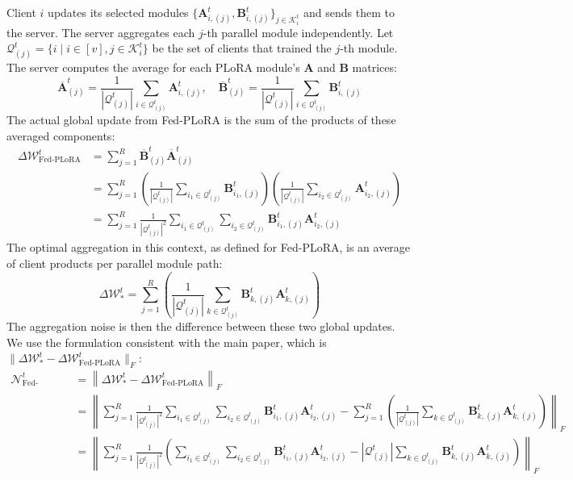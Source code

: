 \documentclass{article} %
\newcommand{\mat}[1]{\mathbf{#1}}
\begin{document}
Client $i$ updates its selected modules $\{\mat{A}_{i,(j)}^t, \mat{B}_{i,(j)}^t\}_{j \in \mathcal{K}_i^t}$ and sends them to the server.
The server aggregates each $j$-th parallel module independently. Let $\mathcal{Q}_{(j)}^t = \{i \mid i \in [v], j \in \mathcal{K}_i^t\}$ be the set of clients that trained the $j$-th module. The server computes the average for each PLoRA module's $\mat{A}$ and $\mat{B}$ matrices:
$$\overline{\mat{A}}_{(j)}^t = \frac{1}{|\mathcal{Q}_{(j)}^t|} \sum_{i \in \mathcal{Q}_{(j)}^t} \mat{A}_{i,(j)}^t, \quad \overline{\mat{B}}_{(j)}^t = \frac{1}{|\mathcal{Q}_{(j)}^t|} \sum_{i \in \mathcal{Q}_{(j)}^t} \mat{B}_{i,(j)}^t$$
The actual global update from Fed-PLoRA is the sum of the products of these averaged components:
\begin{align*}
\Delta\boldsymbol{\mathcal{W}}_{\text{Fed-PLoRA}}^t &= \sum_{j=1}^R \overline{\mat{B}}_{(j)}^t \overline{\mat{A}}_{(j)}^t \\
&= \sum_{j=1}^R \left( \frac{1}{|\mathcal{Q}_{(j)}^t|} \sum_{i_1 \in \mathcal{Q}_{(j)}^t} \mat{B}_{i_1,(j)}^t \right) \left( \frac{1}{|\mathcal{Q}_{(j)}^t|} \sum_{i_2 \in \mathcal{Q}_{(j)}^t} \mat{A}_{i_2,(j)}^t \right) \\
&= \sum_{j=1}^R \frac{1}{|\mathcal{Q}_{(j)}^t|^2} \sum_{i_1 \in \mathcal{Q}_{(j)}^t} \sum_{i_2 \in \mathcal{Q}_{(j)}^t} \mat{B}_{i_1,(j)}^t \mat{A}_{i_2,(j)}^t
\end{align*}
The optimal aggregation in this context, as defined for Fed-PLoRA, is an average of client products per parallel module path:
$$\Delta\boldsymbol{\mathcal{W}}_{*}^t = \sum_{j=1}^R \left( \frac{1}{|\mathcal{Q}_{(j)}^t|} \sum_{k \in \mathcal{Q}_{(j)}^t} \mat{B}_{k,(j)}^t \mat{A}_{k,(j)}^t \right)$$
The aggregation noise is then the difference between these two global updates. We use the formulation consistent with the main paper, which is $\|\Delta\boldsymbol{\mathcal{W}}_{*}^t-\Delta\boldsymbol{\mathcal{W}}_{\text{Fed-PLoRA}}^t \|_F$:
\begin{align*}
\mathcal{N}_{\text{Fed-PLoRA\_Agg}}^{t} &= \left\| \Delta\boldsymbol{\mathcal{W}}_{*}^t - \Delta\boldsymbol{\mathcal{W}}_{\text{Fed-PLoRA}}^t\right\|_F \\
&= \left\| \sum_{j=1}^R \frac{1}{|\mathcal{Q}_{(j)}^t|^2} \sum_{i_1 \in \mathcal{Q}_{(j)}^t} \sum_{i_2 \in \mathcal{Q}_{(j)}^t} \mat{B}_{i_1,(j)}^t \mat{A}_{i_2,(j)}^t - \sum_{j=1}^R \left( \frac{1}{|\mathcal{Q}_{(j)}^t|} \sum_{k \in \mathcal{Q}_{(j)}^t} \mat{B}_{k,(j)}^t \mat{A}_{k,(j)}^t \right) \right\|_F \\
&= \left\| \sum_{j=1}^R \frac{1}{|\mathcal{Q}_{(j)}^t|^2} \left( \sum_{i_1 \in \mathcal{Q}_{(j)}^t} \sum_{i_2 \in \mathcal{Q}_{(j)}^t} \mat{B}_{i_1,(j)}^t \mat{A}_{i_2,(j)}^t - |\mathcal{Q}_{(j)}^t| \sum_{k \in \mathcal{Q}_{(j)}^t} \mat{B}_{k,(j)}^t \mat{A}_{k,(j)}^t \right) \right\|_F
\end{align*}
\end{document}
